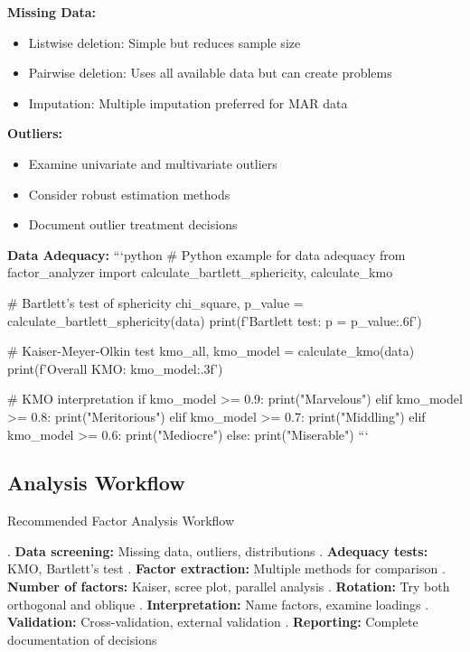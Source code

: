 \documentclass[a4paper]{tufte-book}
\begin{document}
\textbf{Missing Data:}
\begin{itemize}
\item Listwise deletion: Simple but reduces sample size
\item Pairwise deletion: Uses all available data but can create problems
\item Imputation: Multiple imputation preferred for MAR data
\end{itemize}

\textbf{Outliers:}
\begin{itemize}
\item Examine univariate and multivariate outliers
\item Consider robust estimation methods
\item Document outlier treatment decisions
\end{itemize}

\textbf{Data Adequacy:}
```python
# Python example for data adequacy
from factor_analyzer import calculate_bartlett_sphericity, calculate_kmo

# Bartlett's test of sphericity
chi_square, p_value = calculate_bartlett_sphericity(data)
print(f'Bartlett test: p = {p_value:.6f}')

# Kaiser-Meyer-Olkin test
kmo_all, kmo_model = calculate_kmo(data)
print(f'Overall KMO: {kmo_model:.3f}')

# KMO interpretation
if kmo_model >= 0.9:
    print("Marvelous")
elif kmo_model >= 0.8:
    print("Meritorious")  
elif kmo_model >= 0.7:
    print("Middling")
elif kmo_model >= 0.6:
    print("Mediocre")
else:
    print("Miserable")
```

\subsection{Analysis Workflow}

\begin{algorithm}
\caption{Recommended Factor Analysis Workflow}
\begin{algorithmic}
. \textbf{Data screening:} Missing data, outliers, distributions
. \textbf{Adequacy tests:} KMO, Bartlett's test
. \textbf{Factor extraction:} Multiple methods for comparison
. \textbf{Number of factors:} Kaiser, scree plot, parallel analysis
. \textbf{Rotation:} Try both orthogonal and oblique
. \textbf{Interpretation:} Name factors, examine loadings
. \textbf{Validation:} Cross-validation, external validation
. \textbf{Reporting:} Complete documentation of decisions
\end{algorithmic}
\end{algorithm}
\end{document}
